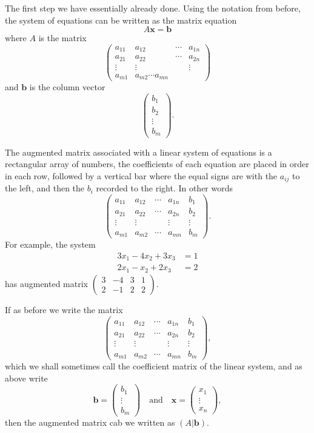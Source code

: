 \documentclass[10pt, a4paper]{article}
\newcommand{\mbf}[1]{\mathbf{#1}}
\begin{document}
The first step we have essentially already done.
Using the notation from before,
the system of equations can be written as the matrix equation
\[
A\mbf{x} = \mbf{b}
\]
where $A$ is the matrix
\[
\begin{pmatrix}
    a_{1 1} & a_{1 2} & \dotsi & a_{1 n} \\
    a_{2 1} & a_{2 2} & \dotsi & a_{2 n} \\
    \vdots & \vdots & \phantom{} & \vdots \\
    a_{m 1} & a_{m 2} \dotsi a_{m n}
\end{pmatrix}
\]
and $\mbf{b}$ is the column vector
\[
\begin{pmatrix}
    b_1 \\ b_2 \\ \vdots \\ b_m
\end{pmatrix}.
\]

The augmented matrix associated with a linear system of equations is a rectangular array of numbers,
the coefficients of each equation are placed in order in each row,
followed by a vertical bar where the equal signs are with the $a_{i j}$ to the left,
and then the $b_i$ recorded to the right.
In other words
\[
\left(
\begin{array}{cccc|c}
    a_{1 1} & a_{1 2} & \dotsi & a_{1 n} & b_1 \\
    a_{2 1} & a_{2 2} & \dotsi & a_{2 n} & b_2 \\
    \vdots & \vdots & \phantom{} & \vdots & \vdots \\
    a_{m 1} & a_{m 2} & \dotsi & a_{m n} & b_m
\end{array}
\right).
\]
For example, the system
\begin{align*}
    3x_1 - 4x_2 + 3x_3 &= 1 \\
    2x_1 - x_2 + 2x_3 &= 2
\end{align*}
has augmented matrix $\left(
\begin{array}{ccc|c}
    3 & -4 & 3 & 1 \\
    2 & -1 & 2 & 2
\end{array}
\right).$

If as before we write the matrix
\[
\left(
\begin{array}{cccc|c}
    a_{1 1} & a_{1 2} & \dotsi & a_{1 n} & b_1 \\
    a_{2 1} & a_{2 2} & \dotsi & a_{2 n} & b_2 \\
    \vdots & \vdots & \phantom{} & \vdots & \vdots \\
    a_{m 1} & a_{m 2} & \dotsi & a_{m n} & b_m
\end{array}
\right),
\]
which we shall sometimes call the coefficient matrix of the linear system,
and as above write
\[
\mbf{b} = \begin{pmatrix}
    b_1 \\ \vdots \\ b_m
\end{pmatrix}
\quad\text{and}\quad\mbf{x} = \begin{pmatrix}
    x_1 \\ \vdots \\ x_n
\end{pmatrix},
\]
then the augmented matrix cab we written as $(A | \mbf{b})$.
\end{document}
